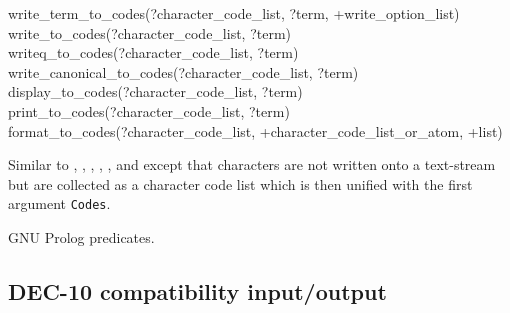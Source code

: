 \begin{TemplatesOneCol}
write\_term\_to\_codes(?character\_code\_list, ?term, +write\_option\_list)\\
write\_to\_codes(?character\_code\_list, ?term)\\
writeq\_to\_codes(?character\_code\_list, ?term)\\
write\_canonical\_to\_codes(?character\_code\_list, ?term)\\
display\_to\_codes(?character\_code\_list, ?term)\\
print\_to\_codes(?character\_code\_list, ?term)\\
format\_to\_codes(?character\_code\_list, +character\_code\_list\_or\_atom,
+list)

\end{TemplatesOneCol}

\Description

\texttt{}%
\texttt{}%
\texttt{}%
\texttt{}%
\texttt{}%
\texttt{}%
\texttt{}%
Similar to , , ,
, , 
 and   except that
characters are not written onto a text-stream but are collected as a
character code list which is then unified with the first argument
\texttt{Codes}.

\begin{PlErrors}


 

 


\end{PlErrors}

\Portability

GNU Prolog predicates.

\subsection{DEC-10 compatibility input/output}

